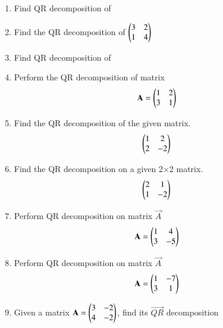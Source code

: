 \begin{enumerate}[label=\thesection.\arabic*.,ref=\thesection.\theenumi]
\item Find QR decomposition of 
\\
\solution

\item Find the QR decomposition of $\begin{pmatrix}3&2\\1&4\end{pmatrix}$ 
\\
\solution

%
\item Find QR decomposition of 
\\
\solution

%
\item Perform the QR decomposition of matrix 
\begin{align}
 \mathbf{A}=\begin{pmatrix}1&2\\3&1\end{pmatrix}
\end{align}
\solution

\item Find the QR decomposition of the given matrix.
\begin{align}
    \begin{pmatrix}1&2\\2&-2\end{pmatrix}
\end{align}
\solution

%
\item Find the QR decomposition  on a given 2$\times$2 matrix. 
\begin{align}
    \begin{pmatrix}2&1\\1&-2\end{pmatrix}
\end{align}
%
\solution

\item Perform QR decomposition on matrix $\vec{A}$
\begin{align}
    \mathbf{A}=\begin{pmatrix} 1 & 4 \\ 3 & -5 \end{pmatrix}\label{eq:solutions/2/21/givmat}
\end{align}
\solution

%
\item  Perform QR decomposition on matrix $\vec{A}$
\begin{align}
    \mathbf{A}=\begin{pmatrix} 1 & -7 \\ 3 & 1 \end{pmatrix}\label{eq:solutions/2/22/givmat}
\end{align}
\solution


\item Given a matrix $\mathbf{A} = \begin{pmatrix}3 & -2\\4 & -2\end{pmatrix}$, find its $\vec{QR}$ decomposition
%
\solution

\solution

\end{enumerate}
